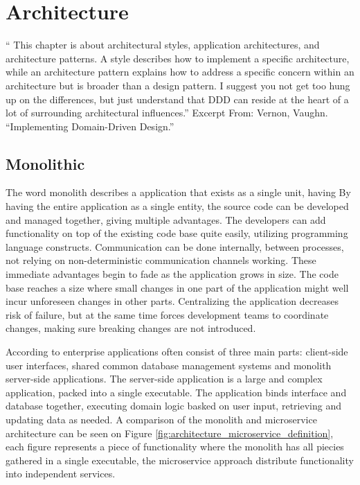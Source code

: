 \chapter{Architecture}
\label{ch:architecture}

“ This chapter is about architectural styles, application architectures, and architecture patterns. A style describes how to implement a specific architecture, while an architecture pattern explains how to address a specific concern within an architecture but is broader than a design pattern. I suggest you not get too hung up on the differences, but just understand that DDD can reside at the heart of a lot of surrounding architectural influences.”
Excerpt From: Vernon, Vaughn. “Implementing Domain-Driven Design.”


\section{Monolithic}
The word monolith describes a application that exists as a single unit, having  By having the entire application as a single entity, the source code can be developed and managed together, giving multiple advantages\cite[p.~68]{long2017cloud}. The developers can add functionality on top of the existing code base quite easily, utilizing programming language constructs. Communication can be done internally, between processes, not relying on non-deterministic communication channels working. These immediate advantages begin to fade as the application grows in size. The code base reaches a size where small changes in one part of the application might well incur unforeseen changes in other parts. Centralizing the application decreases risk of failure, but at the same time forces development teams to coordinate changes, making sure breaking changes are not introduced\cite[p.~68]{long2017cloud}. 

According to \citeauthor{fowler2014microservices} enterprise applications often consist of three main parts: client-side user interfaces, shared common database management systems and monolith server-side applications. The server-side application is a large and complex application, packed into a single executable. The application binds interface and database together, executing domain logic basked on user input, retrieving and updating data as needed. A comparison of the monolith and microservice architecture can be seen on Figure \ref{fig:architecture_microservice_definition}, each figure represents a piece of functionality where the monolith has all piecies gathered in a single executable, the microservice approach distribute functionality into independent services.

